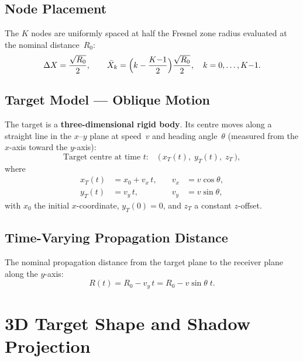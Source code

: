 \documentclass[11pt,a4paper]{article}
\begin{document}
\subsection{Node Placement}

The $K$ nodes are uniformly spaced at half the Fresnel zone radius
evaluated at the nominal distance~$R_0$:
\begin{equation}
  \Delta X = \frac{\sqrt{R_0}}{2},
  \qquad
  \bar{X}_k = \Bigl(k - \frac{K{-}1}{2}\Bigr)\frac{\sqrt{R_0}}{2},
  \quad k=0,\ldots,K{-}1.
  \label{eq:node_positions}
\end{equation}

\subsection{Target Model --- Oblique Motion}
\label{sec:target_model}

The target is a \textbf{three-dimensional rigid body}.  Its centre
moves along a straight line in the $x$--$y$ plane at speed~$v$ and
heading angle~$\theta$ (measured from the $x$-axis toward the
$y$-axis):
\begin{equation}
  \text{Target centre at time } t:\quad
  \bigl(\,x_T(t),\;y_T(t),\;z_T\,\bigr),
  \label{eq:target_pos}
\end{equation}
where
\begin{align}
  x_T(t) &= x_0 + v_x\,t, &\quad v_x &= v\cos\theta,
  \label{eq:xT}\\
  y_T(t) &= v_y\,t,        &\quad v_y &= v\sin\theta,
  \label{eq:yT}
\end{align}
with $x_0$ the initial $x$-coordinate, $y_T(0)=0$, and $z_T$ a
constant $z$-offset.

\subsection{Time-Varying Propagation Distance}
\label{sec:R_of_t}

The nominal propagation distance from the target plane to the
receiver plane along the $y$-axis:
\begin{equation}
  R(t) = R_0 - v_y\,t = R_0 - v\sin\theta\;\!t.
  \label{eq:R_of_t}
\end{equation}

\section{3D Target Shape and Shadow Projection}
\label{sec:3d_shadow}
\end{document}
